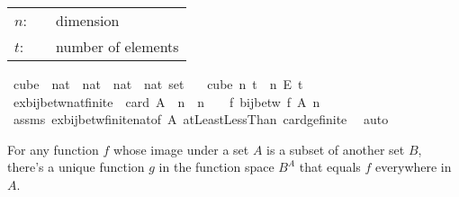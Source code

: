 \begin{isabellebody}
\begin{isamarkuptext}
\begin{tabular}{lcp{8cm}}
$n$:& \isa{nat}& dimension\\
$t$:&  \isa{nat}& number of elements\\
\end{tabular}%
\end{isamarkuptext}\isamarkuptrue%
\isamarkupfalse%
\ cube\ {\isacharcolon}{\kern0pt}{\isacharcolon}{\kern0pt}\ {\isachardoublequoteopen}nat\ {\isasymRightarrow}\ nat\ {\isasymRightarrow}\ {\isacharparenleft}{\kern0pt}nat\ {\isasymRightarrow}\ nat{\isacharparenright}{\kern0pt}\ set{\isachardoublequoteclose}\isanewline
\ \ \ {\isachardoublequoteopen}cube\ n\ t\ {\isasymequiv}\ {\isacharbraceleft}{\kern0pt}{\isachardot}{\kern0pt}{\isachardot}{\kern0pt}{\isacharless}{\kern0pt}n{\isacharbraceright}{\kern0pt}\ {\isasymrightarrow}\isactrlsub E\ {\isacharbraceleft}{\kern0pt}{\isachardot}{\kern0pt}{\isachardot}{\kern0pt}{\isacharless}{\kern0pt}t{\isacharbraceright}{\kern0pt}{\isachardoublequoteclose}\isanewline
\isanewline
{}\isamarkupfalse%
\ ex{\isacharunderscore}{\kern0pt}bij{\isacharunderscore}{\kern0pt}betw{\isacharunderscore}{\kern0pt}nat{\isacharunderscore}{\kern0pt}finite{\isacharunderscore}{\kern0pt}{}{\isacharcolon}{\kern0pt}\ \ {\isachardoublequoteopen}card\ A\ {\isacharequal}{\kern0pt}\ n{\isachardoublequoteclose}\ \ {\isachardoublequoteopen}n\ {\isachargreater}{\kern0pt}\ {}{\isachardoublequoteclose}\ \ {\isachardoublequoteopen}{\isasymexists}f{\isachardot}{\kern0pt}\ bij{\isacharunderscore}{\kern0pt}betw\ f\ A\ {\isacharbraceleft}{\kern0pt}{\isachardot}{\kern0pt}{\isachardot}{\kern0pt}{\isacharless}{\kern0pt}n{\isacharbraceright}{\kern0pt}{\isachardoublequoteclose}\isanewline
%
\isadelimproof
\ \ %
\endisadelimproof
%
\isatagproof
{}\isamarkupfalse%
\ assms\ ex{\isacharunderscore}{\kern0pt}bij{\isacharunderscore}{\kern0pt}betw{\isacharunderscore}{\kern0pt}finite{\isacharunderscore}{\kern0pt}nat{\isacharbrackleft}{\kern0pt}of\ A{\isacharbrackright}{\kern0pt}\ atLeast{}LessThan\ card{\isacharunderscore}{\kern0pt}ge{\isacharunderscore}{\kern0pt}{}{\isacharunderscore}{\kern0pt}finite\ \isamarkupfalse%
\ auto%
\endisatagproof
{\isafoldproof}%
%
\isadelimproof
%
\endisadelimproof
%
\begin{isamarkuptext}%
For any function $f$ whose image under a set $A$ is a subset of another set $B$, there's a unique function $g$ in the function space $B^A$ that equals $f$ everywhere in $A$.

\end{isamarkuptext}
\end{isabellebody}
